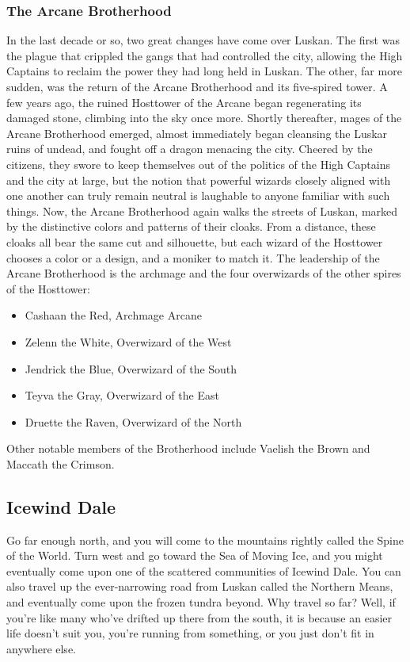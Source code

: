 \documentclass[10pt,a4paper,twoside,twocolumn,openany,bg=print,nodeprecatedcode]{dndbook}
\begin{document}
\subsubsection{The Arcane Brotherhood}
In the last decade or so, two great changes have come over Luskan. The first was the plague that crippled the gangs that had controlled the city, allowing the High Captains to reclaim the power they had long held in Luskan. The other, far more sudden, was the return of the Arcane Brotherhood and its five-spired tower. A few years ago, the ruined Hosttower of the Arcane began regenerating its damaged stone, climbing into the sky once more. Shortly thereafter, mages of the Arcane Brotherhood emerged, almost immediately began cleansing the Luskar ruins of undead, and fought off a dragon menacing the city. Cheered by the citizens, they swore to keep themselves out of the politics of the High Captains and the city at large, but the notion that powerful wizards closely aligned with one another can truly remain neutral is laughable to anyone familiar with such things.
Now, the Arcane Brotherhood again walks the streets of Luskan, marked by the distinctive colors and patterns of their cloaks. From a distance, these cloaks all bear the same cut and silhouette, but each wizard of the Hosttower chooses a color or a design, and a moniker to match it. The leadership of the Arcane Brotherhood is the archmage and the four overwizards of the other spires of the Hosttower:

\begin{itemize}
\item Cashaan the Red, Archmage Arcane
\item Zelenn the White, Overwizard of the West
\item Jendrick the Blue, Overwizard of the South
\item Teyva the Gray, Overwizard of the East
\item Druette the Raven, Overwizard of the North
\end{itemize}

Other notable members of the Brotherhood include Vaelish the Brown and Maccath the Crimson.
\subsection{Icewind Dale}
Go far enough north, and you will come to the mountains rightly called the Spine of the World. Turn west and go toward the Sea of Moving Ice, and you might eventually come upon one of the scattered communities of Icewind Dale. You can also travel up the ever-narrowing road from Luskan called the Northern Means, and eventually come upon the frozen tundra beyond.
Why travel so far? Well, if you're like many who've drifted up there from the south, it is because an easier life doesn't suit you, you're running from something, or you just don't fit in anywhere else.
\end{document}

